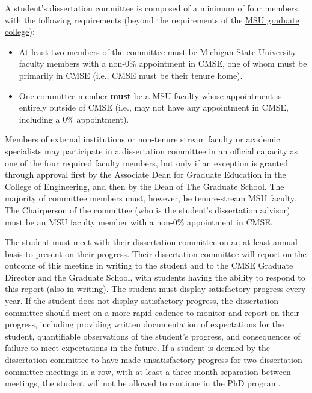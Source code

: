 A student's dissertation committee is composed of a minimum of four
members with the following requirements (beyond the requirements of
the \href{https://hr.msu.edu/documents/facacadhandbooks/facultyhandbook/composition.htm}{MSU graduate
college}):

\begin{itemize}
\item At least two members of the committee must be Michigan State
  University faculty members with a non-0\% appointment in CMSE, one
  of whom must be primarily in CMSE (i.e., CMSE must be their tenure
  home).

\item One committee member \textbf{must} be a MSU faculty whose appointment
  is entirely outside of CMSE (i.e., may not have any appointment in
  CMSE, including a 0\% appointment).

\end{itemize}

Members of external institutions or non-tenure stream faculty or
academic specialists may participate in a dissertation committee in an
official capacity as one of the four required faculty members, but
only if an exception is granted through approval first by the
Associate Dean for Graduate Education in the College of Engineering,
and then by the Dean of The Graduate School.  The majority of
committee members must, however, be tenure-stream MSU faculty.  The
Chairperson of the committee (who is the student's dissertation
advisor) must be an MSU faculty member with a non-0\% appointment in
CMSE.

The student must meet with their dissertation committee on an at least
annual basis to present on their progress.  Their dissertation
committee will report on the outcome of this meeting in writing to the
student and to the CMSE Graduate Director and the Graduate School,
with students having the ability to respond to this report (also in
writing).
The student must display satisfactory progress every year.  If the
student does not display satisfactory progress, the dissertation
committee should meet on a more rapid cadence to monitor and report on
their progress, including providing written documentation of
expectations for the student, quantifiable observations of the
student's progress, and consequences of failure to meet expectations
in the future.  If a student is deemed by the dissertation committee
to have made unsatisfactory progress for two dissertation committee
meetings in a row, with at least a three month separation between
meetings, the student will not be allowed to continue in the PhD
program.

